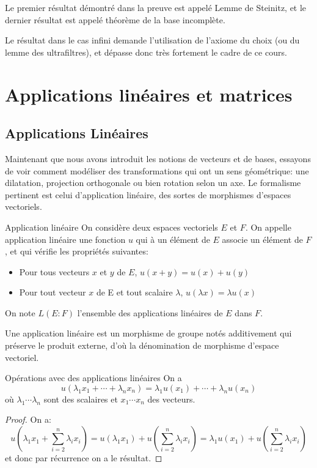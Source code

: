 \documentclass{classe}
\begin{document}
Le premier résultat démontré dans la preuve est appelé Lemme de Steinitz, et le dernier résultat est appelé théorème de la base incomplète.

Le résultat dans le cas infini demande l'utilisation de l'axiome du choix (ou du lemme des ultrafiltres), et dépasse donc très fortement le cadre de ce cours.

\section{Applications linéaires et matrices}
\subsection{Applications Linéaires}
Maintenant que nous avons introduit les notions de vecteurs et de bases, essayons de voir comment modéliser des transformations qui ont un sens géométrique: une dilatation, projection orthogonale ou bien rotation selon un axe.
Le formalisme pertinent est celui d'application linéaire, des sortes de morphismes d'espaces vectoriels.

\begin{définition}{Application linéaire}{}
On considère deux espaces vectoriels $E$ et $F$.
On appelle application linéaire une fonction $u$ qui à un élément de $E$ associe un élément de $F$, et qui vérifie les propriétés suivantes:
\begin{itemize}
	\item Pour tous vecteurs $x$ et $y$ de $E$, $u(x+y) = u(x)+u(y)$
	\item Pour tout vecteur $x$ de E et tout scalaire $\lambda$, $u(\lambda x) = \lambda u(x)$
\end{itemize}
On note $L\left( E:F \right)$ l'ensemble des applications linéaires de $E$ dans $F$.
\end{définition}

Une application linéaire est un morphisme de groupe notés additivement qui préserve le produit externe, d'où la dénomination de morphisme d'espace vectoriel.

\begin{propositionfr}{Opérations avec des applications linéaires}{}
	On a
	\begin{equation*}
		u(\lambda_1 x_1 + \cdots + \lambda_n x_n) = \lambda_1 u(x_1) + \cdots + \lambda_n u(x_n)
	\end{equation*}
	où $\lambda_1 \cdots \lambda_n$ sont des scalaires et $x_1 \cdots x_n$ des vecteurs.
\end{propositionfr}
\begin{proof}
	On a:
	\begin{equation*}
		u\left( \lambda_{1}x_{1} + \sum_{i = 2}^{n} \lambda_{i}x_{i}\right) = u\left( \lambda_{1}x_{1} \right) + u\left( \sum_{i = 2}^{n} \lambda_{i}x_{i} \right) = \lambda_{1}u\left( x_{1} \right) + u\left( \sum_{i = 2}^{n} \lambda_{i}x_{i} \right)
	\end{equation*}
	et donc par récurrence on a le résultat.
\end{proof}
\end{document}
